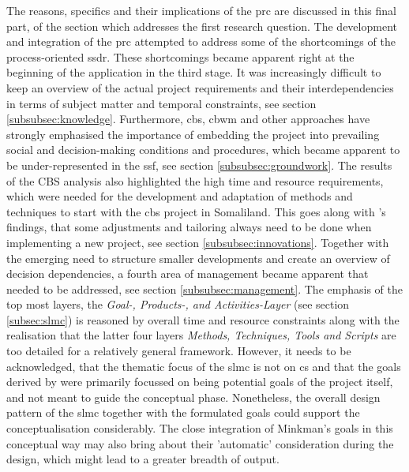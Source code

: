 The reasons, specifics and their implications of the \acrlong{prc} are discussed in this final part, of the section which addresses the first research question. The development and integration of the \acrshort{prc} attempted to address some of the shortcomings of the process-oriented \acrshort{ssdr}. These shortcomings became apparent right at the beginning of the application in the third stage. It was increasingly difficult to keep an overview of the actual project requirements and their interdependencies in terms of subject matter and temporal constraints, see section \ref{subsubsec:knowledge}. Furthermore, \acrshort{cbs}, \acrshort{cbwm} and other approaches have strongly emphasised the importance of embedding the project into prevailing social and decision-making conditions and procedures, which became apparent to be under-represented in the \acrshort{ssf}, see section \ref{subsubsec:groundwork}. The results of the CBS analysis also highlighted the high time and resource requirements, which were needed for the development and adaptation of methods and techniques to start with the \acrshort{cbs} project in Somaliland. This goes along with \citeauthor{garciaFindingWhatYou2021}'s \citeyear{garciaFindingWhatYou2021} findings, that some adjustments and tailoring always need to be done when implementing a new project, see section \ref{subsubsec:innovations}. Together with the emerging need to structure smaller developments and create an overview of decision dependencies, a fourth area of management became apparent that needed to be addressed, see section \ref{subsubsec:management}.\newline
The emphasis of the top most layers, the \textit{Goal-, Products-, and Activities-Layer} (see section \ref{subsec:slmc}) is reasoned by overall time and resource constraints along with the realisation that the latter four layers \textit{Methods, Techniques, Tools and Scripts} are too detailed for a relatively general framework. However, it needs to be acknowledged, that the thematic focus of the \acrshort{slmc} is not on \acrshort{cs} and that the goals derived by \autocite{minkmanCitizenScienceWater2015} were primarily focussed on being potential goals of the project itself, and not meant to guide the conceptual phase. Nonetheless, the overall design pattern of the \acrshort{slmc} together with the formulated goals could support the conceptualisation considerably. The close integration of Minkman's \citeyear{minkmanCitizenScienceWater2015} goals in this conceptual way may also bring about their 'automatic' consideration during the design, which might lead to a greater breadth of output.\newline
